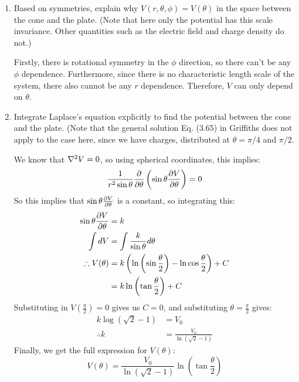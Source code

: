 \documentclass[10pt]{article}
\begin{document}
	\begin{enumerate}[label=\alph*)]
		\item Based on symmetries, explain why $V(r, \theta, \phi) = V(\theta)$ in the space between the cone
			and the plate. (Note that here only the potential has this scale invariance. Other quantities such
			as the electric field and charge density do not.)

			\begin{solution}
				Firstly, there is rotational symmetry in the $\phi$ direction, so there can't be any $\phi$ 
				dependence. Furthermore, since there is no characteristic length scale of the system, there
				also cannot be any $r$ dependence. Therefore, $V$ can only depend on $\theta$.
			\end{solution}
		\item Integrate Laplace's equation explicitly to find the potential between the cone and the plate. (Note
			that the general solution Eq. (3.65) in Griffiths does not apply to the case here, since we have
			charges, distributed at $\theta = \pi/4$ and $\pi/2$.
			
			\begin{solution}
				We know that $\nabla^2 V = 0$, so using spherical coordinates, this implies:
				\[
					\frac{1}{r^2\sin \theta} \pdv{\theta}\left( \sin \theta \pdv{V}{\theta} \right) = 0
				\] 
				So this implies that $\sin \theta \pdv{V}{\theta}$ is a constant, so integrating this: 
				\begin{align*}
					\sin \theta \pdv{V}{\theta} &= k \\
					\int dV &= \int \frac{k}{\sin \theta}d\theta  \\
					\therefore V(\theta) &= k\left( \ln\left( \sin \frac{\theta}{2} \right) -
					\ln\cos \frac{\theta}{2} \right) +C \\
					&= k\ln\left( \tan \frac{\theta}{2} \right) +C
				\end{align*}
				Substituting in $V(\frac{\pi}{2}) = 0$ gives us $C = 0$, and substituting $\theta =
				\frac{\pi}{2}$ gives:
				\begin{align*}
					k\log(\sqrt{2} -1) &= V_0 \\
					\therefore k&= \frac{V_0}{\ln(\sqrt{2} -1)}
				\end{align*}
				Finally, we get the full expression for $V(\theta)$: 
				\[
				V(\theta) = \frac{V_0}{\ln(\sqrt{2} -1)}\ln \left( \tan \frac{\theta}{2} \right) 
				\] 
			\end{solution}
	\end{enumerate}
\end{document}
